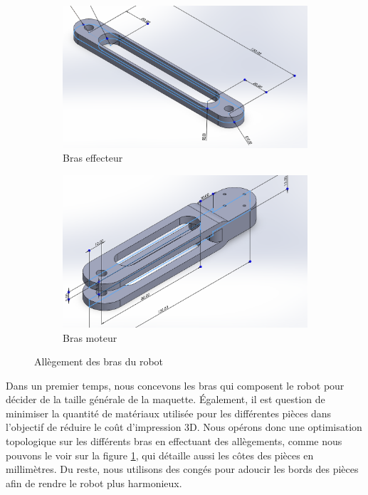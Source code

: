 \documentclass[a4paper, 11pt]{report}
\begin{document}
\begin{figure}[h]
    \centering
    \begin{subfigure}[t]{0.50\textwidth}
        \centering
        \includegraphics[width=\textwidth]{Figures/bras_effecteur.png}
        \caption{Bras effecteur}
    \end{subfigure}
    \hfill
    \begin{subfigure}[t]{0.45\textwidth}
        \centering
        \includegraphics[width=\textwidth]{Figures/bras_moteur.png}
        \caption{Bras moteur}
    \end{subfigure}
    \caption{Allègement des bras du robot}
    \label{fig:bras}
\end{figure}

Dans un premier temps, nous concevons les bras qui composent le robot pour décider de la taille générale de la maquette.
Également, il est question de minimiser la quantité de matériaux utilisée pour les différentes pièces dans l'objectif de réduire le coût d'impression 3D.
Nous opérons donc une optimisation topologique sur les différents bras en effectuant des allègements, comme nous pouvons le voir sur la figure \ref{fig:bras}, 
qui détaille aussi les côtes des pièces en millimètres. Du reste, nous utilisons des congés pour adoucir les bords des pièces afin de rendre le robot plus harmonieux.
\end{document}
